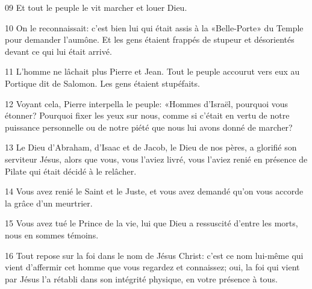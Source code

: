
09 Et tout le peuple le vit marcher et louer Dieu.

10 On le reconnaissait: c’est bien lui qui était assis à la «Belle-Porte» du Temple pour demander l’aumône. Et les gens étaient frappés de stupeur et désorientés devant ce qui lui était arrivé.

11 L’homme ne lâchait plus Pierre et Jean. Tout le peuple accourut vers eux au Portique dit de Salomon. Les gens étaient stupéfaits.

12 Voyant cela, Pierre interpella le peuple: «Hommes d’Israël, pourquoi vous étonner? Pourquoi fixer les yeux sur nous, comme si c’était en vertu de notre puissance personnelle ou de notre piété que nous lui avons donné de marcher?

13 Le Dieu d’Abraham, d’Isaac et de Jacob, le Dieu de nos pères, a glorifié son serviteur Jésus, alors que vous, vous l’aviez livré, vous l’aviez renié en présence de Pilate qui était décidé à le relâcher.

14 Vous avez renié le Saint et le Juste, et vous avez demandé qu’on vous accorde la grâce d’un meurtrier.

15 Vous avez tué le Prince de la vie, lui que Dieu a ressuscité d’entre les morts, nous en sommes témoins.

16 Tout repose sur la foi dans le nom de Jésus Christ: c’est ce nom lui-même qui vient d’affermir cet homme que vous regardez et connaissez; oui, la foi qui vient par Jésus l’a rétabli dans son intégrité physique, en votre présence à tous.